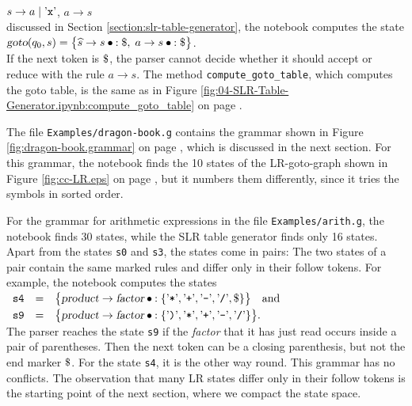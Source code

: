 \\[0.2cm]
\hspace*{1.3cm}
$s \rightarrow a \mid \mbox{'\texttt{x}'}$, \quad $a \rightarrow s$
\\[0.2cm]
discussed in Section \ref{section:slr-table-generator}, the notebook computes the state
\\[0.2cm]
\hspace*{1.3cm}
$\textsl{goto}(q_0, s) = \bigl\{ \widehat{s} \rightarrow s \mdot: \symbol{36},\;
                                 a \rightarrow s \mdot: \symbol{36} \bigr\}$.
\\[0.2cm]
If the next token is $\symbol{36}$, the parser cannot decide whether it should accept or reduce with the rule
$a \rightarrow s$.  The method \texttt{compute\_goto\_table}, which computes the goto table, is the same as in
Figure \ref{fig:04-SLR-Table-Generator.ipynb:compute_goto_table} on page
\pageref{fig:04-SLR-Table-Generator.ipynb:compute_goto_table}.

The file \texttt{Examples/dragon-book.g} contains the grammar shown in Figure \ref{fig:dragon-book.grammar} on page
\pageref{fig:dragon-book.grammar}, which is discussed in the next section.  For this grammar, the notebook finds the
10 states of the LR-goto-graph shown in Figure \ref{fig:cc-LR.eps} on page \pageref{fig:cc-LR.eps}, but it numbers
them differently, since it tries the symbols in sorted order.

For the grammar for arithmetic expressions in the file \texttt{Examples/arith.g}, the notebook finds 30 states,
while the SLR table generator finds only 16 states.  Apart from the states \texttt{s0} and \texttt{s3}, the states
come in pairs:  The two states of a pair contain the same marked rules and differ only in their follow tokens.
For example, the notebook computes the states
\\[0.2cm]
\hspace*{1.3cm}
$\begin{array}[t]{lcl}
   \texttt{s4}  & = & \bigl\{ \textsl{product} \rightarrow \textsl{factor} \mdot:
                      \{ \saquoted{*}, \saquoted{+}, \saquoted{-}, \saquoted{/}, \symbol{36} \} \bigr\}
                      \quad \mbox{and} \\[0.1cm]
   \texttt{s9}  & = & \bigl\{ \textsl{product} \rightarrow \textsl{factor} \mdot:
                      \{ \saquoted{)}, \saquoted{*}, \saquoted{+}, \saquoted{-}, \saquoted{/} \} \bigr\}.
 \end{array}$
\\[0.2cm]
The parser reaches the state \texttt{s9} if the \textsl{factor} that it has just read occurs inside a pair of
parentheses.  Then the next token can be a closing parenthesis, but not the end marker $\symbol{36}$.  For the state
\texttt{s4}, it is the other way round.  This grammar has no conflicts.  The observation that many LR states differ
only in their follow tokens is the starting point of the next section, where we compact the state space.

